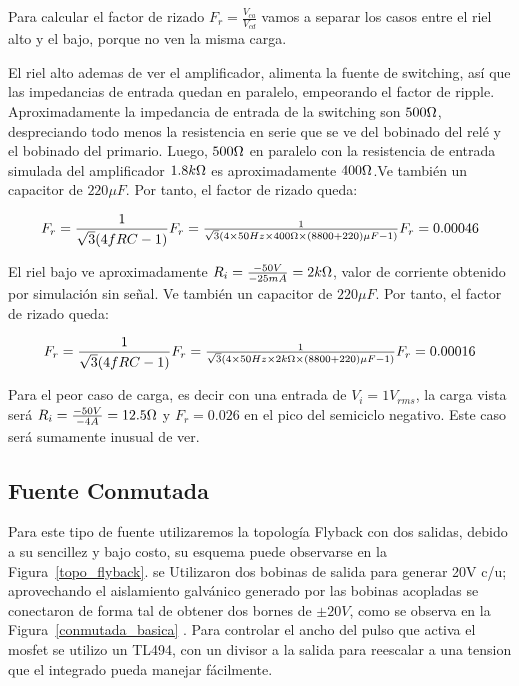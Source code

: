 Para calcular el factor de rizado $F_r=\frac{V_{ca}}{V_{cd}}$ vamos a separar los casos entre el riel alto y el bajo, porque no ven la misma carga.

El riel alto ademas de ver el amplificador, alimenta la fuente de switching, así que las impedancias de entrada quedan en paralelo, empeorando el factor de ripple. Aproximadamente la impedancia de entrada de la switching son $500\ohm$, despreciando todo menos la resistencia en serie que se ve del bobinado del relé y el bobinado del primario. Luego, $500\ohm$ en paralelo con la resistencia de entrada simulada del amplificador $1.8k\ohm$ es aproximadamente $400\ohm$.Ve también un capacitor de $220{\mu}F$.
Por tanto, el factor de rizado queda:

\[
	F_r=\frac{1}{\sqrt{3}(4fRC-1)}$$
$$	F_r=\frac{1}{\sqrt{3}(4\times 50Hz\times 400\ohm\times (8800+220){\mu}F-1)}$$
$$	F_r=0.00046
\]

El riel bajo ve aproximadamente $R_i=\frac{-50V}{-25mA}=2k\ohm$, valor de corriente obtenido por simulación sin señal. Ve también un capacitor de $220{\mu}F$.
Por tanto, el factor de rizado queda:

\[
	F_r=\frac{1}{\sqrt{3}(4fRC-1)}$$
$$	F_r=\frac{1}{\sqrt{3}(4\times 50Hz\times 2k\ohm\times (8800+220){\mu}F-1)}$$
$$	F_r=0.00016
\]

Para el peor caso de carga, es decir con una entrada de $V_i=1V_{rms}$, la carga vista será $R_i=\frac{-50V}{-4A}=12.5\ohm$ y $F_r=0.026$ en el pico del semiciclo negativo. Este caso será sumamente inusual de ver.

\subsection{Fuente Conmutada}

Para este tipo de fuente utilizaremos la topología Flyback con dos salidas, debido a su sencillez y bajo costo, su esquema puede observarse en la Figura~\ref{topo_flyback}. se Utilizaron dos bobinas de salida para generar 20V c/u; aprovechando el aislamiento galvánico generado por las bobinas acopladas se conectaron de forma tal de obtener dos bornes de $\pm 20V$, como se observa en la Figura~\ref{conmutada_basica} . Para controlar el ancho del pulso que activa el mosfet se utilizo un TL494, con un divisor a la salida para reescalar a una tension que el integrado pueda manejar fácilmente.

